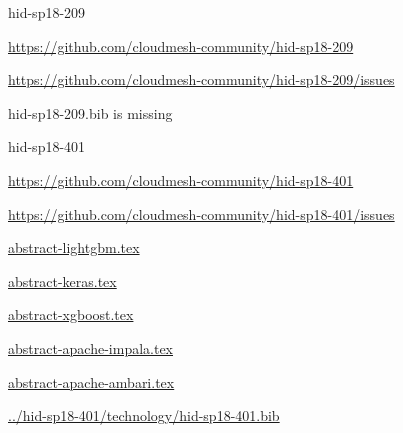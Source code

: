 \begin{IU}

hid-sp18-209

\url{https://github.com/cloudmesh-community/hid-sp18-209}

\url{https://github.com/cloudmesh-community/hid-sp18-209/issues}

hid-sp18-209.bib is missing

\end{IU}


\begin{IU}

hid-sp18-401

\url{https://github.com/cloudmesh-community/hid-sp18-401}

\url{https://github.com/cloudmesh-community/hid-sp18-401/issues}

\href{https://github.com/cloudmesh-community/hid-sp18-401/blob/master//technology/abstract-lightgbm.tex}{abstract-lightgbm.tex}

\href{https://github.com/cloudmesh-community/hid-sp18-401/blob/master//technology/abstract-keras.tex}{abstract-keras.tex}

\href{https://github.com/cloudmesh-community/hid-sp18-401/blob/master//technology/abstract-xgboost.tex}{abstract-xgboost.tex}

\href{https://github.com/cloudmesh-community/hid-sp18-401/blob/master//technology/abstract-apache-impala.tex}{abstract-apache-impala.tex}

\href{https://github.com/cloudmesh-community/hid-sp18-401/blob/master//technology/abstract-apache-ambari.tex}{abstract-apache-ambari.tex}

\href{https://github.com/cloudmesh-community/hid-sp18-401/blob/master//technology/hid-sp18-401.bib}{../hid-sp18-401/technology/hid-sp18-401.bib}

\end{IU}


